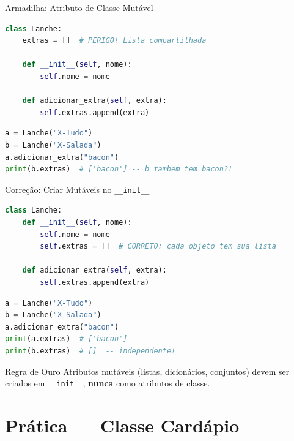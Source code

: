 \documentclass[aspectratio=169]{beamer}
\begin{document}
\begin{frame}[fragile]{Armadilha: Atributo de Classe Mutável}
  \begin{lstlisting}[language=Python]
class Lanche:
    extras = []  # PERIGO! Lista compartilhada

    def __init__(self, nome):
        self.nome = nome

    def adicionar_extra(self, extra):
        self.extras.append(extra)
  \end{lstlisting}

  \begin{lstlisting}[language=Python]
a = Lanche("X-Tudo")
b = Lanche("X-Salada")
a.adicionar_extra("bacon")
print(b.extras)  # ['bacon'] -- b tambem tem bacon?!
  \end{lstlisting}
\end{frame}

\begin{frame}[fragile]{Correção: Criar Mutáveis no \texttt{\_\_init\_\_}}
  \begin{lstlisting}[language=Python]
class Lanche:
    def __init__(self, nome):
        self.nome = nome
        self.extras = []  # CORRETO: cada objeto tem sua lista

    def adicionar_extra(self, extra):
        self.extras.append(extra)
  \end{lstlisting}

  \begin{lstlisting}[language=Python]
a = Lanche("X-Tudo")
b = Lanche("X-Salada")
a.adicionar_extra("bacon")
print(a.extras)  # ['bacon']
print(b.extras)  # []  -- independente!
  \end{lstlisting}

  \begin{alertblock}{Regra de Ouro}
    Atributos mutáveis (listas, dicionários, conjuntos) devem ser
    criados em \texttt{\_\_init\_\_}, \textbf{nunca} como atributos de classe.
  \end{alertblock}
\end{frame}

\section{Prática --- Classe Cardápio}
\end{document}

